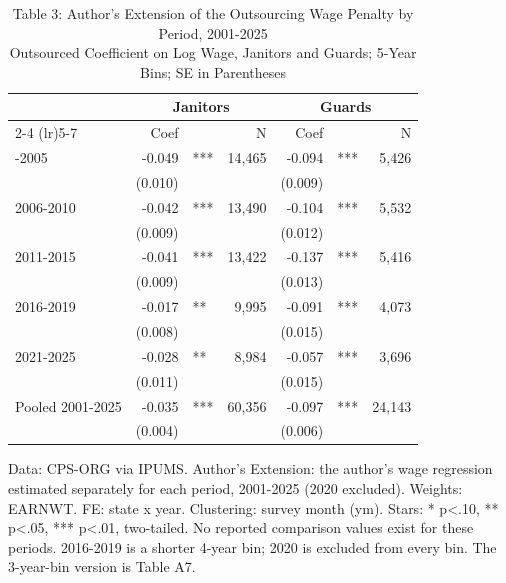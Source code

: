 \begin{table}[!t]
\caption*{
{\large Table 3: Author's Extension of the Outsourcing Wage Penalty by Period, 2001-2025} \\
{\small Outsourced Coefficient on Log Wage, Janitors and Guards; 5-Year Bins; SE in Parentheses}
} 

\fontsize{10.0pt}{12.0pt}\selectfont

\begin{tabular*}{\linewidth}{@{\extracolsep{\fill}}l|rlrrlr}
\toprule
  & \multicolumn{3}{c}{Janitors} & \multicolumn{3}{c}{Guards} \\ 
\cmidrule(lr){2-4} \cmidrule(lr){5-7}
  & Coef &  & N & Coef &  & N \\ 
\midrule\addlinespace[2.5pt]
2001-2005 & -0.049 & *** & 14,465 & -0.094 & *** & 5,426 \\
 & (0.010) &  &  & (0.009) &  &  \\
2006-2010 & -0.042 & *** & 13,490 & -0.104 & *** & 5,532 \\
 & (0.009) &  &  & (0.012) &  &  \\
2011-2015 & -0.041 & *** & 13,422 & -0.137 & *** & 5,416 \\
 & (0.009) &  &  & (0.013) &  &  \\
2016-2019 & -0.017 & ** & 9,995 & -0.091 & *** & 4,073 \\
 & (0.008) &  &  & (0.015) &  &  \\
2021-2025 & -0.028 & ** & 8,984 & -0.057 & *** & 3,696 \\
 & (0.011) &  &  & (0.015) &  &  \\
Pooled 2001-2025 & -0.035 & *** & 60,356 & -0.097 & *** & 24,143 \\
 & (0.004) &  &  & (0.006) &  &  \\
\bottomrule
\end{tabular*}
\begin{minipage}{\linewidth}
Data: CPS-ORG via IPUMS. Author's Extension: the author's wage regression estimated separately for each period, 2001-2025 (2020 excluded). Weights: EARNWT. FE: state x year. Clustering: survey month (ym). Stars: * p<.10, ** p<.05, *** p<.01, two-tailed. No reported comparison values exist for these periods. 2016-2019 is a shorter 4-year bin; 2020 is excluded from every bin. The 3-year-bin version is Table A7.\\
\end{minipage}
\end{table}
